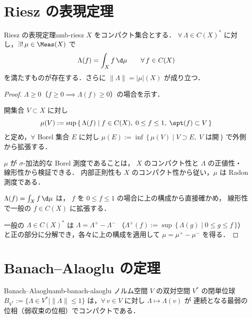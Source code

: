 \section{Riesz の表現定理}
\label{sec:riesz}

\begin{theorem}{Riesz の表現定理}{amb-riesz}
  $X$ をコンパクト集合とする．
  $\forall\, \Lambda \in C(X)^*$ に対し，$\exists!\, \mu \in \Meas(X)$ で
  \[
    \Lambda(f) = \int_X f\,\d\mu
    \qquad \forall\, f \in C(X)
  \]
  を満たすものが存在する．さらに $\|\Lambda\| = |\mu|(X)$ が成り立つ．
\end{theorem}

\begin{proof}
  $\Lambda \geq 0$（$f \geq 0 \implies \Lambda(f) \geq 0$）の場合を示す．

  開集合 $V \subset X$ に対し
  \[
    \mu(V) := \sup\,\{\,\Lambda(f) \mid f \in C(X),\; 0 \leq f \leq 1,\; \spt(f) \subset V\,\}
  \]
  と定め，$\forall$ Borel 集合 $E$ に対し
  $\mu(E) := \inf\,\{\,\mu(V) \mid V \supset E,\; V \text{ は開}\,\}$
  で外側から拡張する．

  $\mu$ が $\sigma$-加法的な Borel 測度であることは，
  $X$ のコンパクト性と $\Lambda$ の正値性・線形性から検証できる．
  内部正則性も $X$ のコンパクト性から従い，$\mu$ は Radon 測度である．

  $\Lambda(f) = \int_X f\,\d\mu$ は，
  $f$ を $0 \leq f \leq 1$ の場合に上の構成から直接確かめ，
  線形性で一般の $f \in C(X)$ に拡張する．

  一般の $\Lambda \in C(X)^*$ は $\Lambda = \Lambda^+ - \Lambda^-$
  （$\Lambda^+(f) := \sup\,\{\,\Lambda(g) \mid 0 \leq g \leq f\,\}$）
  と正の部分に分解でき，各々に上の構成を適用して
  $\mu = \mu^+ - \mu^-$ を得る．
\end{proof}

\section{Banach–Alaoglu の定理}
\label{sec:banach-alaoglu}

\begin{theorem}{Banach–Alaoglu}{amb-banach-alaoglu}
  ノルム空間 $V$ の双対空間 $V^*$ の閉単位球
  $B_{V^*} := \{\Lambda \in V^* \mid \|\Lambda\| \leq 1\}$
  は，$\forall\, v \in V$ に対し $\Lambda \mapsto \Lambda(v)$ が
  連続となる最弱の位相（弱収束の位相）でコンパクトである．
\end{theorem}


